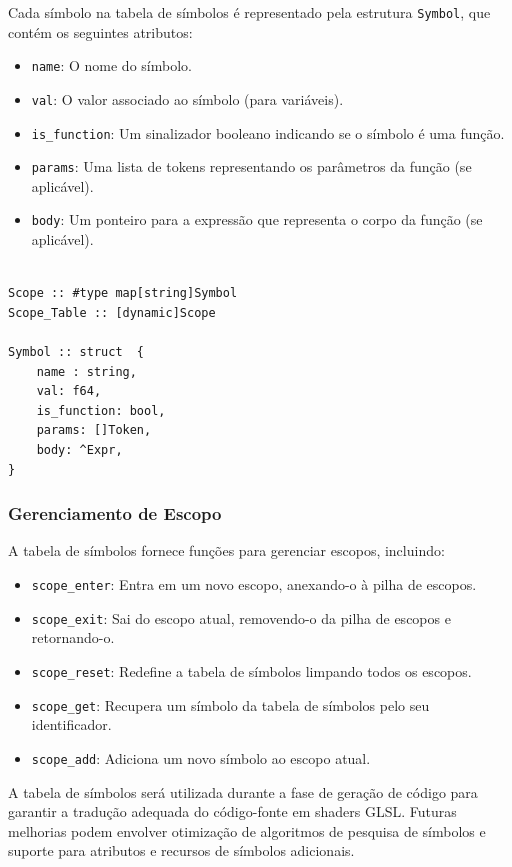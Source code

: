 \documentclass[english, 
               brazil, 
               bsc] %
               {dcomp-abntex2}
\begin{document}
Cada símbolo na tabela de símbolos é representado pela estrutura \texttt{Symbol}, que contém os seguintes atributos:
\begin{itemize}
    \item \texttt{name}: O nome do símbolo.
    \item \texttt{val}: O valor associado ao símbolo (para variáveis).
    \item \texttt{is\_function}: Um sinalizador booleano indicando se o símbolo é uma função.
    \item \texttt{params}: Uma lista de tokens representando os parâmetros da função (se aplicável).
    \item \texttt{body}: Um ponteiro para a expressão que representa o corpo da função (se aplicável).
\end{itemize}

\begin{lstlisting}

Scope :: #type map[string]Symbol
Scope_Table :: [dynamic]Scope

Symbol :: struct  {
    name : string,
    val: f64,
    is_function: bool,
    params: []Token,
    body: ^Expr,
}

\end{lstlisting}

\subsubsection{Gerenciamento de Escopo}

A tabela de símbolos fornece funções para gerenciar escopos, incluindo:
\begin{itemize}
    \item \texttt{scope\_enter}: Entra em um novo escopo, anexando-o à pilha de escopos.
    \item \texttt{scope\_exit}: Sai do escopo atual, removendo-o da pilha de escopos e retornando-o.
    \item \texttt{scope\_reset}: Redefine a tabela de símbolos limpando todos os escopos.
    \item \texttt{scope\_get}: Recupera um símbolo da tabela de símbolos pelo seu identificador.
    \item \texttt{scope\_add}: Adiciona um novo símbolo ao escopo atual.
\end{itemize}


A tabela de símbolos será utilizada durante a fase de geração de código para garantir a tradução adequada do código-fonte em shaders GLSL. Futuras melhorias podem envolver otimização de algoritmos de pesquisa de símbolos e suporte para atributos e recursos de símbolos adicionais.
\end{document}
